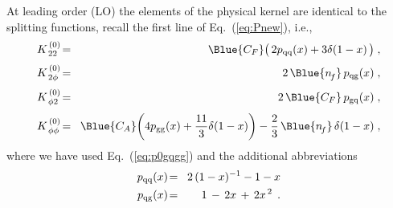 \documentclass[12pt]{article}
\def\colour4colour#1{\Blue{#1}}
\newcommand{\bea}{\begin{eqnarray}}
\newcommand{\eea}{\end{eqnarray}}
\newcommand{\nn}{\nonumber}
\begin{document}
At leading order (LO) the elements of the physical kernel are identical to
the splitting functions, recall the first line of Eq.~(\ref{eq:Pnew}), i.e.,
%
\bea
 \label{eq:K220}
 K_{\,22}^{\,(0)} &\! = \!&
  \colour4colour{\cf} \* \big( \,
          2 \* \pqq(x)
          + 3\* \delta(1 - x)
          \,\big)
%
 \; ,\\[1mm]
 \label{eq:K2p0}
 K_{\,2\phi}^{\,(0)} &\! = \!&
          2\, \* \colour4colour{\nf} \, \* \pqg(x)
 \; , \\[1mm]
 \label{eq:Kp20}
 K_{\,\phi 2}^{\,(0)} &\! = \!&
          2\, \* \colour4colour{\cf} \, \* \pgq(x)
 \; ,\\[1mm]
 \label{eq:Kpp0}
 K_{\,\phi \phi}^{\,(0)} &\! = \!&
         \colour4colour{\ca}  \*  \bigg(
            4 \* \pgg(x)
          + {11 \over 3} \* \delta(1 - x)
          \bigg)
          - {2 \over 3} \, \* \colour4colour{\nf} \, \* \delta(1 - x)
 \; ,
\eea
%
where we have used Eq.~(\ref{eq:p0gqgg}) and the additional abbreviations
%
\bea
\label{eq:p0qqqg}
  p_{\rm{qq}}(x) &\!=\!& 2\, (1 - x)^{-1} - 1 - x
  \nn \\
  p_{\rm{qg}}(x) &\! =\! & 1\, -\, 2x\, +\, 2x^{\,2} 
  \:\: .
\eea
\end{document}
